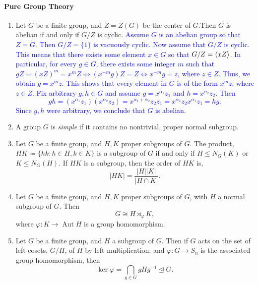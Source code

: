 \documentclass{article}
\newcommand{\expl}[1]{\textcolor{blue}{#1}}
\begin{document}
	\paragraph{Pure Group Theory}
	\begin{enumerate}[resume = algebra]
		\item Let $G$ be a finite group, and $Z = Z(G)$ be the center of $G$.Then $G$ is abelian if and only if $G/Z$ is cyclic. \newline \expl{Assume $G$ is an abelian group so that $Z =G$. Then $G/Z = \{1\}$ is vacuously cyclic. Now assume that $G/Z$ is cyclic. This means that there exists some element $x \in G$ so that $G/Z= \braket{xZ}$. In particular, for every $g \in G$, there exists some integer $m$ such that $gZ = (xZ)^{m} = x^{m}Z \iff (x^{-m}g)Z = Z \iff x^{-m}g = z$, where $z \in Z$. Thus, we obtain $g = x^{m}z$. This shows that every element in $G$ is of the form $x^{m}z$, where $z \in Z$. Fix arbitrary $g, h \in G$ and assume $g = x^{\alpha_1}z_{1}$ and $h = x^{\alpha_2}z_2$. Then $$gh = (x^{\alpha_1}z_{1})(x^{\alpha_2}z_2) = x^{\alpha_1 + \alpha_2}z_2z_1 = x^{\alpha_2}z_2x^{\alpha_1}z_1 = hg.$$ Since $g, h$ were arbitrary, we conclude that $G$ is abelian.}
		\item A group $G$ is \textit{simple} if it contains no nontrivial, proper normal subgroup.
		\item Let $G$ be a finite group, and $H, K$ proper subgroups of $G$. The product, $HK \coloneqq \{hk: h \in H, k \in K\}$ is a subgroup of $G$ if and only if $H \leq N_{G}(K)$ or $K \leq N_{G}(H)$. If $HK$ is a subgroup, then the order of $HK$ is, 
		\begin{equation*}
			|HK| = \frac{|H||K|}{|H \cap K|}. 
		\end{equation*}
		\item Let $G$ be a finite group, and $H, K$ proper subgroups of $G$, with $H$ a normal subgroup of $G$. Then 
		\begin{equation*}
			G \cong H \rtimes_{\varphi} K, 
		\end{equation*}
		where $\varphi: K \to \operatorname{Aut}{H}$ is a group homomorphism.
		\item Let $G$ be a finite group, and $H$ a subgroup of $G$. Then if $G$ acts on the set of left cosets, $G/H$, of $H$ by left multiplication, and $\varphi: G \to S_{n}$ is the associated group homomorphism, then 
		\begin{equation*}
			\ker{\varphi} = \bigcap_{g \in G}gHg^{-1} \trianglelefteq G. 
		\end{equation*}

\end{enumerate}
\end{document}
